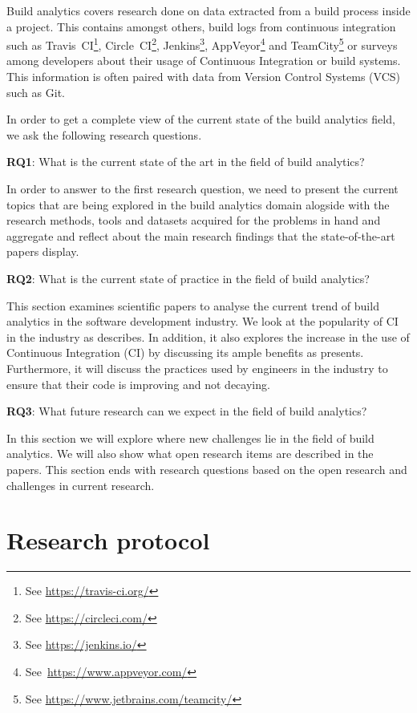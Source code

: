 \documentclass[]{book}
\let\rmarkdownfootnote\footnote%
\def\footnote{\protect\rmarkdownfootnote}
\begin{document}
Build analytics covers research done on data extracted from a build
process inside a project. This contains amongst others, build logs from
continuous integration such as Travis~CI\footnote{See
  \url{https://travis-ci.org/}}, Circle~CI\footnote{See
  \url{https://circleci.com/}}, Jenkins\footnote{See
  \url{https://jenkins.io/}}, AppVeyor\footnote{See~\url{https://www.appveyor.com/}}
and TeamCity\footnote{See \url{https://www.jetbrains.com/teamcity/}} or
surveys among developers about their usage of Continuous Integration or
build systems. This information is often paired with data from Version
Control Systems (VCS) such as Git.

In order to get a complete view of the current state of the build
analytics field, we ask the following research questions.

\textbf{RQ1}: What is the current state of the art in the field of build
analytics?

In order to answer to the first research question, we need to present
the current topics that are being explored in the build analytics domain
alogside with the research methods, tools and datasets acquired for the
problems in hand and aggregate and reflect about the main research
findings that the state-of-the-art papers display.

\textbf{RQ2}: What is the current state of practice in the field of
build analytics?

This section examines scientific papers to analyse the current trend of
build analytics in the software development industry. We look at the
popularity of CI in the industry as \citet{hilton2016usage} describes.
In addition, it also explores the increase in the use of Continuous
Integration (CI) by discussing its ample benefits as
\citet{fowler2006continuous} presents. Furthermore, it will discuss the
practices used by engineers in the industry to ensure that their code is
improving and not decaying.

\textbf{RQ3}: What future research can we expect in the field of build
analytics?

In this section we will explore where new challenges lie in the field of
build analytics. We will also show what open research items are
described in the papers. This section ends with research questions based
on the open research and challenges in current research.

\section{Research protocol}\label{build-analytics-research-protocol}
\end{document}

